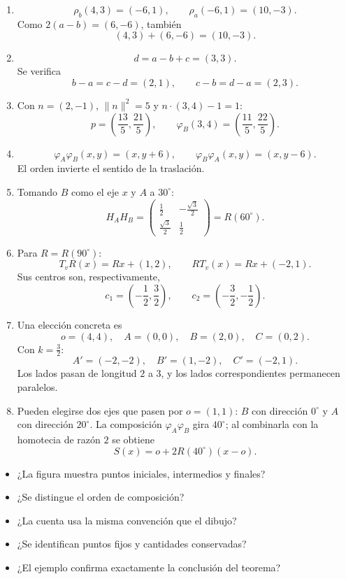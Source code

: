 \begin{enumerate}
  \item
  \[
  \rho_b(4,3)=(-6,1),\qquad
  \rho_a(-6,1)=(10,-3).
  \]
  Como \(2(a-b)=(6,-6)\), también
  \[
    (4,3)+(6,-6)=(10,-3).
  \]

  \item
  \[
    d=a-b+c=(3,3).
  \]
  Se verifica
  \[
  b-a=c-d=(2,1),
  \qquad
  c-b=d-a=(2,3).
  \]

  \item Con \(n=(2,-1)\), \(\lVert n\rVert^2=5\) y
  \(n\cdot(3,4)-1=1\):
  \[
  p=\left(\frac{13}{5},\frac{21}{5}\right),
  \qquad
  \varphi_B(3,4)=
  \left(\frac{11}{5},\frac{22}{5}\right).
  \]

  \item
  \[
  \varphi_A\varphi_B(x,y)=(x,y+6),
  \qquad
  \varphi_B\varphi_A(x,y)=(x,y-6).
  \]
  El orden invierte el sentido de la traslación.

  \item Tomando \(B\) como el eje \(x\) y \(A\) a \(30^\circ\):
  \[
  H_AH_B=
  \begin{pmatrix}
  \frac12&-\frac{\sqrt3}{2}\\
  \frac{\sqrt3}{2}&\frac12
  \end{pmatrix}
  =R(60^\circ).
  \]

  \item Para \(R=R(90^\circ)\):
  \[
  T_vR(x)=Rx+(1,2),
  \qquad
  RT_v(x)=Rx+(-2,1).
  \]
  Sus centros son, respectivamente,
  \[
    c_1=\left(-\frac12,\frac32\right),
    \qquad
    c_2=\left(-\frac32,-\frac12\right).
  \]

  \item Una elección concreta es
  \[
  o=(4,4),\quad
  A=(0,0),\quad B=(2,0),\quad C=(0,2).
  \]
  Con \(k=\frac32\):
  \[
  A'=(-2,-2),\quad B'=(1,-2),\quad C'=(-2,1).
  \]
  Los lados pasan de longitud \(2\) a \(3\), y los lados correspondientes permanecen
  paralelos.

  \item Pueden elegirse dos ejes que pasen por \(o=(1,1)\): \(B\) con dirección
  \(0^\circ\) y \(A\) con dirección \(20^\circ\). La composición
  \(\varphi_A\varphi_B\) gira \(40^\circ\); al combinarla con la homotecia de razón \(2\)
  se obtiene
  \[
    S(x)=o+2R(40^\circ)(x-o).
  \]
\end{enumerate}

\begin{idea}
\begin{itemize}
  \item ¿La figura muestra puntos iniciales, intermedios y finales?
  \item ¿Se distingue el orden de composición?
  \item ¿La cuenta usa la misma convención que el dibujo?
  \item ¿Se identifican puntos fijos y cantidades conservadas?
  \item ¿El ejemplo confirma exactamente la conclusión del teorema?
\end{itemize}
\end{idea}


